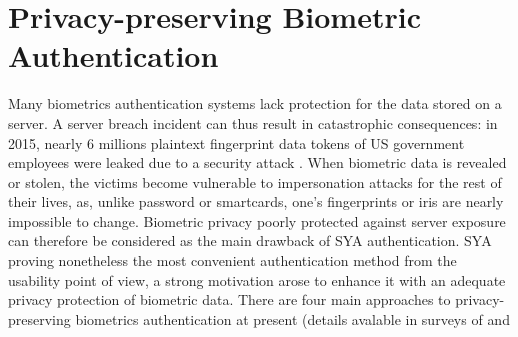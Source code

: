\section{Privacy-preserving Biometric Authentication}
\label{sec:privacyLiteratures}
Many biometrics authentication systems lack protection for the data
stored on a server. A server breach incident can thus result in catastrophic
consequences: in 2015, nearly 6 millions plaintext fingerprint data tokens of US
government employees were leaked due to a security attack
\cite{OPMsays563:online}. When biometric data is revealed or stolen, the victims become vulnerable to impersonation attacks for the rest of their lives, as, unlike password or smartcards, one’s fingerprints or iris are nearly impossible to change. Biometric privacy poorly protected against server exposure can therefore be considered as the main drawback of SYA authentication. SYA proving nonetheless the most convenient authentication method from the usability point of view, a strong
motivation arose to enhance it with an adequate privacy protection of
biometric data. There are four main approaches to privacy-preserving biometrics
authentication at present (details avalable in surveys of \cite{jain201650} and
